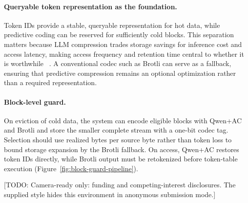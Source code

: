 \documentclass{article}
\newcommand{\todo}[1]{\textcolor{blueprint}{[TODO: #1]}}
\begin{document}
\paragraph{Queryable token representation as the foundation.} Token IDs provide a stable, queryable
representation for hot data, while predictive coding can be reserved for sufficiently cold blocks.
This separation matters because LLM compression trades storage savings for inference cost and
access latency, making access frequency and retention time central to whether it is worthwhile ~\citep{kipf2026waiting}. A conventional codec such as Brotli can serve as a fallback, ensuring that predictive
compression remains an optional optimization rather than a required representation.

\paragraph{Block-level guard.} On eviction of cold data, the system can encode eligible blocks with Qwen+AC
and Brotli and store the smaller complete stream with a one-bit codec tag. Selection should use
realized bytes per source byte rather than token loss to bound storage expansion by the Brotli fallback.
On access, Qwen+AC restores token IDs directly, while Brotli output must be retokenized before
token-table execution (Figure~\ref{fig:block-guard-pipeline}).


\begin{ack}

\todo{Camera-ready only: funding and competing-interest disclosures. The supplied style hides this environment in anonymous submission mode.}

\end{ack}

{\normalsize


}


\newpage







\end{document}
